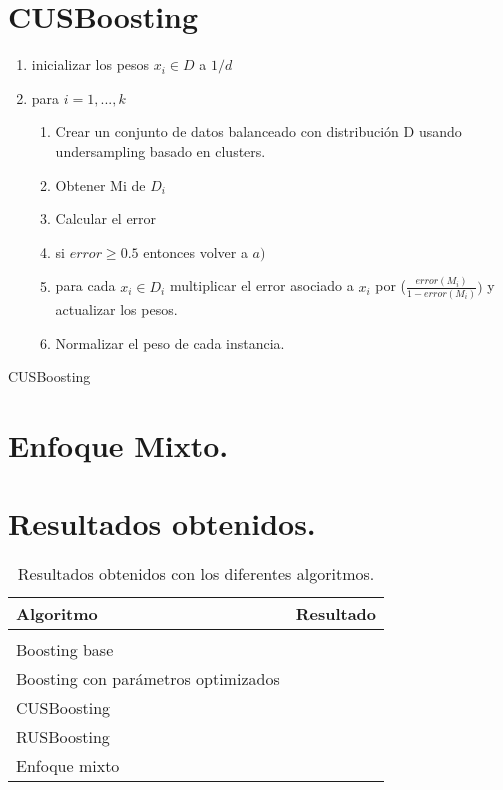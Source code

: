 \section{CUSBoosting}
\begin{algorithm}[H]
	\begin{enumerate}
		\item inicializar los pesos $x_i \in D$ a $1/d$
		\item para $i=1,...,k$
		\begin{enumerate}
			\item Crear un conjunto de datos balanceado con distribución D usando undersampling basado en clusters.
			\item Obtener Mi de $D_i$
			\item Calcular el error 
			\item si $error\geq 0.5$ entonces volver a $a)$
			\item para cada $x_i\in D_i$ multiplicar el error asociado a $x_i$ por ($\frac{error(M_i)}{1-error(M_i)})$ y actualizar los pesos.
			\item Normalizar el peso de cada instancia.  
		\end{enumerate}
	\end{enumerate}
	\caption{CUSBoosting}
\end{algorithm}
\section{Enfoque Mixto.}

\section{Resultados obtenidos.}
\begin{table}[H]
	\centering
	\begin{tabular}{ll}
		\textbf{Algoritmo}& \textbf{Resultado} \\
		\hline
		\\
		Boosting base&      \\
		Boosting con parámetros optimizados& \\
		CUSBoosting &   \\
		RUSBoosting &  \\
		Enfoque mixto &  \\
	\end{tabular}
	\caption{Resultados obtenidos con los diferentes algoritmos.}
\end{table}